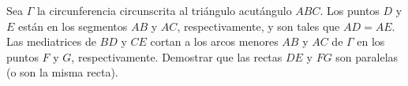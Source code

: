 Sea $\Gamma$ la circunferencia circunscrita al triángulo acutángulo $ABC$. Los puntos $D$ y $E$ están en los segmentos $AB$ y $AC$, respectivamente, y son tales que $AD = AE$. Las mediatrices de $BD$ y $CE$ cortan a los arcos menores $AB$ y $AC$ de $\Gamma$ en los puntos $F$ y $G$, respectivamente. Demostrar que las rectas $DE$ y $FG$ son paralelas (o son la misma recta).